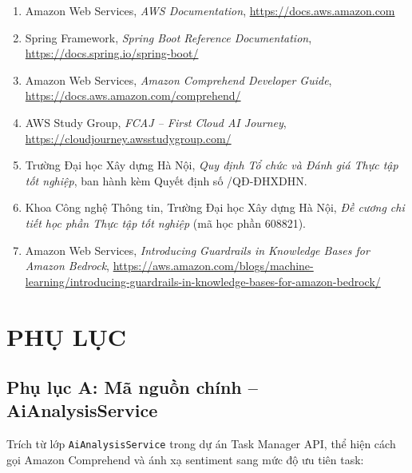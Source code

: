 \documentclass[13pt]{extarticle}
\begin{document}
\begin{enumerate}[leftmargin=1.5cm]
    \item Amazon Web Services, \textit{AWS Documentation},
    \url{https://docs.aws.amazon.com}
    \item Spring Framework, \textit{Spring Boot Reference Documentation},
    \url{https://docs.spring.io/spring-boot/}
    \item Amazon Web Services, \textit{Amazon Comprehend Developer Guide},
    \url{https://docs.aws.amazon.com/comprehend/}
    \item AWS Study Group, \textit{FCAJ -- First Cloud AI Journey},
    \url{https://cloudjourney.awsstudygroup.com/}
    \item Trường Đại học Xây dựng Hà Nội, \textit{Quy định Tổ chức và Đánh
    giá Thực tập tốt nghiệp}, ban hành kèm Quyết định số
    /QĐ-ĐHXDHN.
    \item Khoa Công nghệ Thông tin, Trường Đại học Xây dựng Hà Nội,
    \textit{Đề cương chi tiết học phần Thực tập tốt nghiệp} (mã học phần
    608821).
    \item Amazon Web Services, \textit{Introducing Guardrails in Knowledge
    Bases for Amazon Bedrock},
    \url{https://aws.amazon.com/blogs/machine-learning/introducing-guardrails-in-knowledge-bases-for-amazon-bedrock/}
\end{enumerate}

\newpage

\section*{PHỤ LỤC}

\subsection*{Phụ lục A: Mã nguồn chính -- AiAnalysisService}

Trích từ lớp \texttt{AiAnalysisService} trong dự án Task Manager API, thể
hiện cách gọi Amazon Comprehend và ánh xạ sentiment sang mức độ ưu tiên task:
\end{document}
